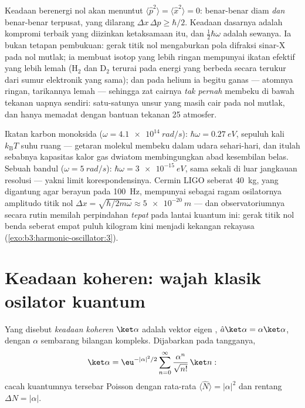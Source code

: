 \begin{remark}\label{rem:b3:harmonic-oscillator:zeropoint}
Keadaan berenergi nol akan menuntut $\langle\hat p^2\rangle =
\langle\hat x^2\rangle = 0$: benar-benar diam \emph{dan} benar-benar
terpusat, yang dilarang $\Delta x\,\Delta p \ge \hbar/2$. Keadaan
dasarnya adalah kompromi terbaik yang diizinkan ketaksamaan itu, dan
$\tfrac12\hbar\omega$ adalah sewanya. Ia bukan tetapan pembukuan: gerak
titik nol mengaburkan pola difraksi sinar-X pada nol mutlak; ia membuat
isotop yang lebih ringan mempunyai ikatan efektif yang lebih lemah
(H$_2$ dan D$_2$ terurai pada energi yang berbeda secara terukur dari
sumur elektronik yang sama); dan pada helium ia begitu ganas --- atomnya
ringan, tarikannya lemah --- sehingga zat cairnya \emph{tak pernah}
membeku di bawah tekanan uapnya sendiri: satu-satunya unsur yang masih
cair pada nol mutlak, dan hanya memadat dengan bantuan tekanan 25
atmosfer.
\end{remark}

\begin{example}\label{ex:b3:harmonic-oscillator:scales}
Ikatan karbon monoksida ($\omega = \qty{4.1e14}{rad/s}$): $\hbar\omega =
\qty{0.27}{eV}$, sepuluh kali $k_{\text{B}}T$ suhu ruang ---
getaran molekul membeku dalam udara sehari-hari, dan itulah sebabnya
kapasitas kalor gas dwiatom membingungkan abad kesembilan belas. Sebuah
bandul ($\omega = \qty{5}{rad/s}$): $\hbar\omega = \qty{3e-15}{eV}$,
sama sekali di luar jangkauan resolusi --- yakni limit korespondensinya.
Cermin LIGO seberat \qty{40}{kg}, yang digantung agar berayun pada
\qty{100}{Hz}, mempunyai sebagai ragam osilatornya amplitudo titik nol $\Delta x =
\sqrt{\hbar/2m\omega} \approx \qty{5e-20}{m}$ --- dan observatoriumnya
secara rutin memilah perpindahan \emph{tepat} pada lantai kuantum ini:
gerak titik nol benda seberat empat puluh kilogram kini menjadi kekangan
rekayasa (\cref{exo:b3:harmonic-oscillator:3}).
\end{example}

\section{Keadaan koheren: wajah klasik osilator kuantum}

\begin{definition}\label{def:b3:harmonic-oscillator:coherent}
Yang disebut \emph{keadaan koheren} $\ket\alpha$ adalah vektor eigen
, $\hat a\ket\alpha = \alpha\ket\alpha$, dengan
$\alpha$ sembarang bilangan kompleks. Dijabarkan pada tangganya,
\[
\ket\alpha = \eu^{-|\alpha|^2/2}\sum_{n=0}^\infty
\frac{\alpha^n}{\sqrt{n!}}\,\ket n :
\]
cacah kuantumnya tersebar Poisson dengan rata-rata $\langle\hat
N\rangle = |\alpha|^2$ dan rentang $\Delta N = |\alpha|$.
\end{definition}

